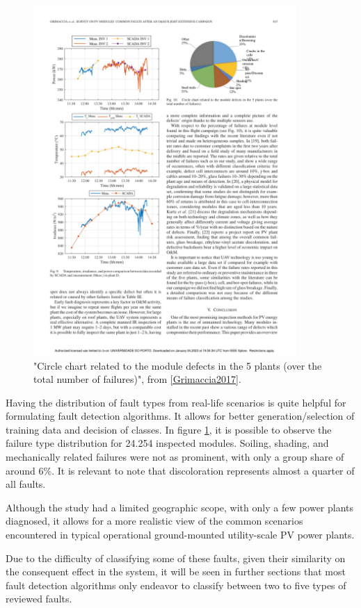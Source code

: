 \begin{figure}[h]
    \centering
    \includegraphics[width=10cm, trim={11cm 20.6cm 2.4cm 2cm},
    clip]{figures/chapter2/chartfailsurvey.pdf} \caption{"Circle chart related to the module defects in the 5 plants
    (over the total number of failures)", from \ref{Grimaccia2017}.}
    \label{fig:faultchart}
\end{figure}

Having the distribution of fault types from real-life scenarios is quite helpful for formulating fault detection algorithms. It allows for better generation/selection of training data and decision of classes. In figure \ref{fig:faultchart}, it is possible to observe the failure type distribution for 24.254 inspected modules. Soiling, shading, and mechanically related failures were not as prominent, with only a group share of around 6\%. It is relevant to note that discoloration represents almost a quarter of all faults.

Although the study had a limited geographic scope, with only a few power plants diagnosed, it allows for a more realistic view of the common scenarios encountered in typical operational ground-mounted utility-scale PV power plants.

Due to the difficulty of classifying some of these faults, given their similarity on the consequent effect in the system, it will be seen in further sections that most fault detection algorithms only endeavor to classify between two to five types of reviewed faults.


